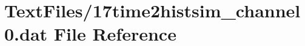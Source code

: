 \hypertarget{17time2histsim__channel0_8dat}{}\section{Text\+Files/17time2histsim\+\_\+channel0.dat File Reference}
\label{17time2histsim__channel0_8dat}
